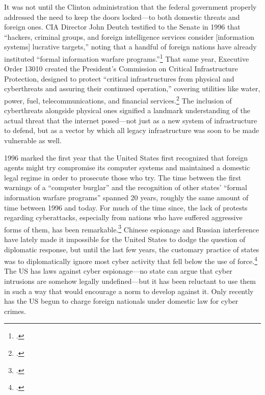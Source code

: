 \documentclass[11pt]{memoir}
\begin{document}
\begin{refsegment}
It was not until the Clinton administration that the federal government properly addressed the need to keep the doors locked---to both domestic threats and foreign ones. CIA Director John Deutch testified to the Senate in 1996 that ``hackers, criminal groups, and foreign intelligence services consider [information systems] lucrative targets,'' noting that a handful of foreign nations have already instituted ``formal information warfare programs.''\footcite{deutch_worldwide_1996} That same year, Executive Order 13010 created the President's Commission on Critical Infrastructure Protection, designed to protect ``critical infrastructures from physical and cyberthreats and assuring their continued operation,'' covering utilities like water, power, fuel, telecommunications, and financial services.\footcite[~p.761]{boys_clinton_2018} The inclusion of cyberthreats alongside physical ones signified a landmark understanding of the actual threat that the internet posed---not just as a new system of infrastructure to defend, but as a vector by which all legacy infrastructure was soon to be made vulnerable as well.

1996 marked the first year that the United States first recognized that foreign agents might try compromise its computer systems and maintained a domestic legal regime in order to prosecute those who try. The time between the first warnings of a ``computer burglar'' and the recognition of other states' ``formal information warfare programs'' spanned 20 years, roughly the same amount of time between 1996 and today. For much of the time since, the lack of protests regarding cyberattacks, especially from nations who have suffered aggressive forms of them, has been remarkable.\footcite[p.~132]{brown_customary_2012} Chinese espionage and Russian interference have lately made it impossible for the United States to dodge the question of diplomatic response, but until the last few years, the customary practice of states was to diplomatically ignore most cyber activity that fell below the use of force.\footcite[p.~141]{brown_customary_2012} The US has laws against cyber espionage---no state can argue that cyber intrusions are somehow legally undefined---but it has been reluctant to use them in such a way that would encourage a norm to develop against it. Only recently has the US begun to charge foreign nationals under domestic law for cyber crimes.


\end{refsegment}
\end{document}
